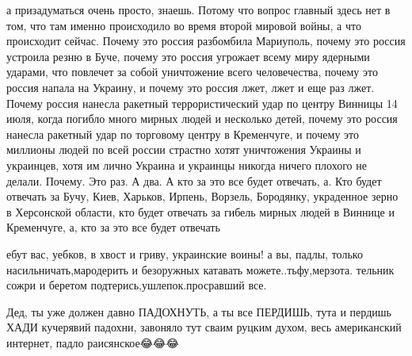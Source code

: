 а призадуматься очень просто, знаешь. Потому что вопрос главный здесь нет в
том, что там именно происходило во время второй мировой войны, а что происходит
сейчас. Почему это россия разбомбила Мариуполь, почему это россия устроила
резню в Буче, почему это россия угрожает всему миру ядерными ударами, что
повлечет за собой уничтожение всего человечества, почему это россия напала на
Украину, и почему это россия лжет, лжет и еще раз лжет. Почему россия нанесла
ракетный террористический удар по центру Винницы 14 июля, когда погибло много
мирных людей и несколько детей, почему это россия нанесла ракетный удар по
торговому центру в Кременчуге, и почему это миллионы людей по всей россии
страстно хотят уничтожения Украины и украинцев, хотя им лично Украина и
украинцы никогда ничего плохого не делали. Почему. Это раз. А два. А кто за это
все будет отвечать, а. Кто будет отвечать за Бучу, Киев, Харьков, Ирпень,
Ворзель, Бородянку, украденное зерно в Херсонской области, кто будет отвечать
за гибель мирных людей в Виннице и Кременчуге, а, кто за это все будет отвечать

ебут вас, уебков, в хвост и гриву, украинские воины! а вы, падлы, только
насильничать,мародерить и безоружных катавать можете..тьфу,мерзота. тельник
сожри и беретом подтерись,ушлепок.просравший все.

Дед, ты уже должен давно ПАДОХНУТЬ, а ты все ПЕРДИШЬ, тута и пердишь🤣🤣🤣ХАДИ
кучерявий падохни, завоняло тут сваим руцким духом, весь американский интернет,
падло раисянское😂😂😂

